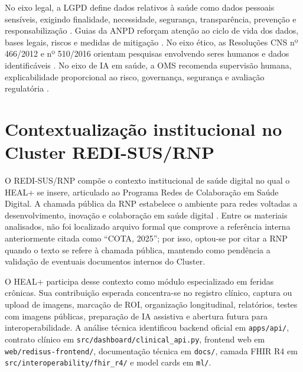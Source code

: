 \documentclass[
    12pt,
    oneside,
    a4paper,
    chapter=TITLE,
    brazil,
    sumario=tradicional,
    hidelinks
]{abntex2}
\begin{document}
No eixo legal, a LGPD define dados relativos à saúde como dados pessoais sensíveis, exigindo finalidade, necessidade, segurança, transparência, prevenção e responsabilização \cite{brasil2018}. Guias da ANPD reforçam atenção ao ciclo de vida dos dados, bases legais, riscos e medidas de mitigação \cite{anpd2023}. No eixo ético, as Resoluções CNS nº 466/2012 e nº 510/2016 orientam pesquisas envolvendo seres humanos e dados identificáveis \cite{brasil2012,brasil2016}. No eixo de IA em saúde, a OMS recomenda supervisão humana, explicabilidade proporcional ao risco, governança, segurança e avaliação regulatória \cite{who2021,who2023}.

\chapter{Contextualização institucional no Cluster REDI-SUS/RNP}

O REDI-SUS/RNP compõe o contexto institucional de saúde digital no qual o HEAL+ se insere, articulado ao Programa Redes de Colaboração em Saúde Digital. A chamada pública da RNP estabelece o ambiente para redes voltadas a desenvolvimento, inovação e colaboração em saúde digital \cite{rnp2025}. Entre os materiais analisados, não foi localizado arquivo formal que comprove a referência interna anteriormente citada como ``COTA, 2025''; por isso, optou-se por citar a RNP quando o texto se refere à chamada pública, mantendo como pendência a validação de eventuais documentos internos do Cluster.

O HEAL+ participa desse contexto como módulo especializado em feridas crônicas. Sua contribuição esperada concentra-se no registro clínico, captura ou upload de imagens, marcação de ROI, organização longitudinal, relatórios, testes com imagens públicas, preparação de IA assistiva e abertura futura para interoperabilidade. A análise técnica identificou backend oficial em \texttt{apps/api/}, contrato clínico em \texttt{src/dashboard/clinical\_api.py}, frontend web em \texttt{web/redisus-frontend/}, documentação técnica em \texttt{docs/}, camada FHIR R4 em \texttt{src/interoperability/fhir\_r4/} e model cards em \texttt{ml/}.
\end{document}
